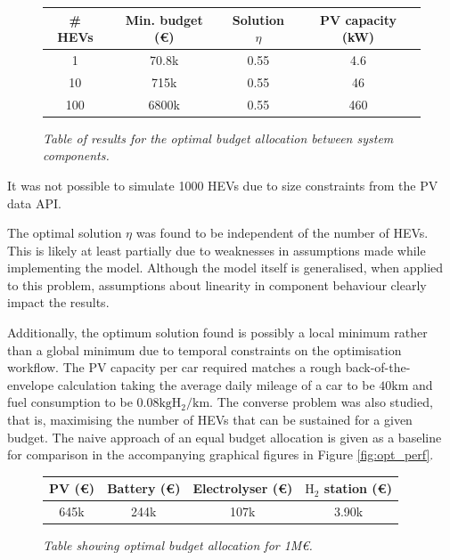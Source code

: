 \documentclass[]{article}
\numberwithin{equation}{section}
\theoremstyle{plain} %
\theoremstyle{definition}
\theoremstyle{remark}
\begin{document}
\begin{figure}[htbp]
    \centering
    \begin{tabular}{|c||c|c|c|}
        \hline
        \# HEVs & Min. budget (\euro{}) & Solution $\eta$ & PV capacity (kW) \\
        \hline
        1       & 70.8k                 & 0.55            & 4.6              \\
        10      & 715k                  & 0.55            & 46               \\
        100     & 6800k                 & 0.55            & 460              \\
        \hline
    \end{tabular}
    \caption{\emph{Table of results for the optimal budget allocation between system components.}}
    \label{fig:min_budget}
\end{figure}

\noindent It was not possible to simulate 1000 HEVs due to size constraints from the PV data API.

The optimal solution $\eta$ was found to be independent of the number of HEVs.
This is likely at least partially due to weaknesses in assumptions made while implementing the model.
Although the model itself is generalised, when applied to this problem,
assumptions about linearity in component behaviour clearly impact the results.

Additionally, the optimum solution found is possibly a local minimum rather than a global minimum
due to temporal constraints on the optimisation workflow.
The PV capacity per car required matches a rough back-of-the-envelope calculation
taking the average daily mileage of a car to be $40\mathrm{km}$ and fuel consumption to be $0.08\mathrm{kg} \mathrm{H_2}/\mathrm{km}$.
\bigbreak
The converse problem was also studied, that is, maximising the number of HEVs that can be sustained for a given budget.
The naive approach of an equal budget allocation is given as a baseline for comparison in the accompanying graphical figures in Figure \ref{fig:opt_perf}.

\begin{figure}[htbp]
    \centering
    \begin{tabular}{|c|c|c|c|}
        \hline
        PV  (\euro{}) & Battery (\euro{}) & Electrolyser (\euro{}) & $\mathrm{H_2}$ station (\euro{}) \\
        \hline
        645k          & 244k              & 107k                   & 3.90k                            \\
        \hline
    \end{tabular}
    \caption{\emph{Table showing optimal budget allocation for 1M\euro{}.}}
    \label{fig:opt_alloc}
\end{figure}
\end{document}
